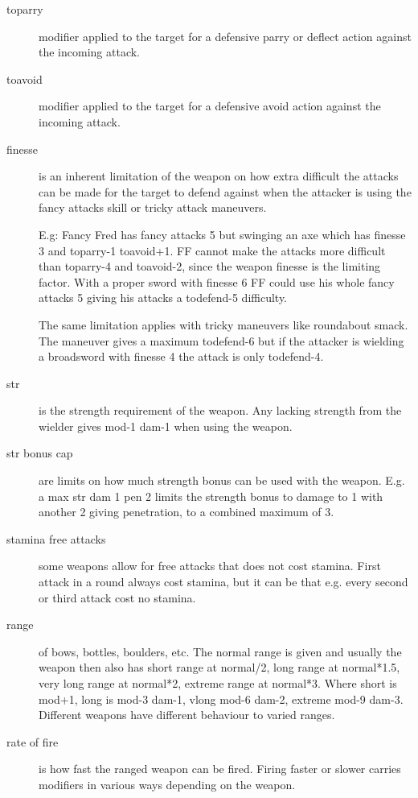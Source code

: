 \begin{description}
\item[toparry] modifier applied to the target for a defensive parry or deflect action against the incoming attack. 

\item[toavoid] modifier applied to the target for a defensive avoid action against the incoming attack.

\item[finesse] is an inherent limitation of the weapon on how extra difficult the attacks can be made for the target to defend against when the attacker is using the fancy attacks skill or tricky attack maneuvers. 

E.g: Fancy Fred has fancy attacks 5 but swinging an axe which has finesse 3 and toparry-1 toavoid+1. FF cannot make the attacks more difficult than toparry-4 and toavoid-2, since the weapon finesse is the limiting factor. With a proper sword with finesse 6 FF could use his whole fancy attacks 5 giving his attacks a todefend-5 difficulty.

The same limitation applies with tricky maneuvers like roundabout smack. The maneuver gives a maximum todefend-6 but if the attacker is wielding a broadsword with finesse 4 the attack is only todefend-4.

\item[str] is the strength requirement of the weapon. Any lacking strength from the wielder gives mod-1 dam-1 when using the weapon.

\item[str bonus cap] are limits on how much strength bonus can be used with the weapon. E.g. a max str dam 1 pen 2 limits the strength bonus to damage to 1 with another 2 giving penetration, to a combined maximum of 3.

\item[stamina free attacks] some weapons allow for free attacks that does not cost stamina. First attack in a round always cost stamina, but it can be that e.g. every second or third attack cost no stamina.

\item[range] of bows, bottles, boulders, etc. The normal range is given and usually the weapon then also has short range at normal/2, long range at normal*1.5, very long range at normal*2, extreme range at normal*3. Where short is mod+1, long is mod-3 dam-1, vlong mod-6 dam-2, extreme mod-9 dam-3. Different weapons have different behaviour to varied ranges.

\item[rate of fire] is how fast the ranged weapon can be fired. Firing faster or slower carries modifiers in various ways depending on the weapon.


\end{description}
